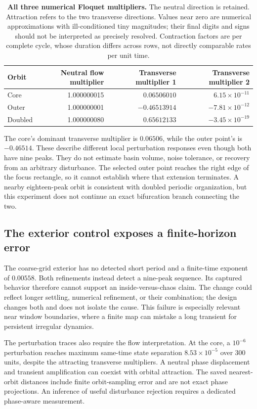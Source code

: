 \documentclass[11pt,letterpaper]{article}
\begin{document}
\begin{table}[H]
\centering\small
\begin{tabular}{lrrr}
\toprule
Orbit & Neutral flow multiplier & Transverse multiplier 1 & Transverse multiplier 2\\
\midrule
Core & 1.000000015 & $0.06506010$ & $6.15\times10^{-11}$\\
Outer & 1.000000001 & $-0.46513914$ & $-7.81\times10^{-12}$\\
Doubled & 1.000000080 & $0.65612133$ & $-3.45\times10^{-19}$\\
\bottomrule
\end{tabular}
\caption{\textbf{All three numerical Floquet multipliers.} The neutral direction is retained. Attraction refers to the two transverse directions. Values near zero are numerical approximations with ill-conditioned tiny magnitudes; their final digits and signs should not be interpreted as precisely resolved. Contraction factors are per complete cycle, whose duration differs across rows, not directly comparable rates per unit time.}
\label{tab:floquet}
\end{table}

The core's dominant transverse multiplier is $0.06506$, while the outer point's is $-0.46514$. These describe different local perturbation responses even though both have nine peaks. They do not estimate basin volume, noise tolerance, or recovery from an arbitrary disturbance. The selected outer point reaches the right edge of the focus rectangle, so it cannot establish where that extension terminates. A nearby eighteen-peak orbit is consistent with doubled periodic organization, but this experiment does not continue an exact bifurcation branch connecting the two.

\subsection{The exterior control exposes a finite-horizon error}
The coarse-grid exterior has no detected short period and a finite-time exponent of $0.00558$. Both refinements instead detect a nine-peak sequence. Its captured behavior therefore cannot support an inside-versus-chaos claim. The change could reflect longer settling, numerical refinement, or their combination; the design changes both and does not isolate the cause. This failure is especially relevant near window boundaries, where a finite map can mistake a long transient for persistent irregular dynamics.

The perturbation traces also require the flow interpretation. At the core, a $10^{-6}$ perturbation reaches maximum same-time state separation $8.53\times10^{-5}$ over 300 units, despite the attracting transverse multipliers. A neutral phase displacement and transient amplification can coexist with orbital attraction. The saved nearest-orbit distances include finite orbit-sampling error and are not exact phase projections. An inference of useful disturbance rejection requires a dedicated phase-aware measurement.
\end{document}
